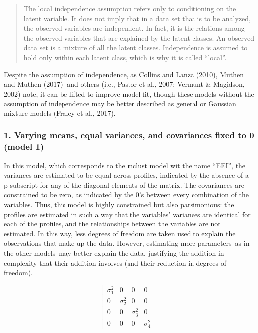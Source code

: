 \documentclass[]{book}
\theoremstyle{definition}
\theoremstyle{definition}
\theoremstyle{definition}
\theoremstyle{remark}
\begin{document}
\begin{quote}
The local independence assumption refers only to conditioning on the
latent variable. It does not imply that in a data set that is to be
analyzed, the observed variables are independent. In fact, it is the
relations among the observed variables that are explained by the latent
classes. An observed data set is a mixture of all the latent classes.
Independence is assumed to hold only within each latent class, which is
why it is called ``local''.
\end{quote}

Despite the assumption of independence, as Collins and Lanza (2010),
Muthen and Muthen (2017), and others (i.e., Pastor et al., 2007; Vermunt
\& Magidson, 2002) note, it can be lifted to improve model fit, though
these models without the assumption of independence may be better
described as general or Gaussian mixture models (Fraley et al., 2017).

\subsubsection{1. Varying means, equal variances, and covariances fixed
to 0 (model
1)}\label{varying-means-equal-variances-and-covariances-fixed-to-0-model-1}

In this model, which corresponds to the mclust model wit the name
``EEI'', the variances are estimated to be equal across profiles,
indicated by the absence of a p subscript for any of the diagonal
elements of the matrix. The covariances are constrained to be zero, as
indicated by the 0's between every combination of the variables. Thus,
this model is highly constrained but also parsimonious: the profiles are
estimated in such a way that the variables' variances are identical for
each of the profiles, and the relationships between the variables are
not estimated. In this way, less degrees of freedom are taken used to
explain the observations that make up the data. However, estimating more
parameters--as in the other models--may better explain the data,
justifying the addition in complexity that their addition involves (and
their reduction in degrees of freedom).

\[
\left[ \begin{matrix} { \sigma  }_{ 1 }^{ 2 } & 0 & 0 & 0 \\ 0 & { \sigma  }_{ 2 }^{ 2 } & 0 & 0 \\ 0 & 0 & { \sigma  }_{ 3 }^{ 2 } & 0 \\ 0 & 0 & 0 & { \sigma  }_{ 4 }^{ 2 } \end{matrix} \right] 
\]
\end{document}
